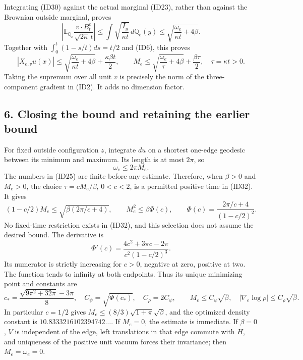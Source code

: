 \documentclass[11pt]{article}
\begin{document}
Integrating (ID30) against the actual marginal (ID23), rather than against the Brownian outside marginal, proves
\[
 \left|\mathbb E_{\mathbb Q_x}\frac{v\cdot B_t^e}{\sqrt{2\kappa}\,t}\right|
 \le\int\sqrt{\frac{I_y}{\kappa t}}\,d\mathbb Q_{\bar e}(y)
 \le\sqrt{\frac{\omega_e}{\kappa t}+4\beta}.
 \tag{ID31}
\]
Together with \(\int_0^t(1-s/t)ds=t/2\) and (ID6), this proves
\[
 |X_{e,v}u(x)|\le\sqrt{\frac{\omega_e}{\kappa t}+4\beta}
                       +\frac{\kappa\beta t}{2},\qquad
 M_e\le\sqrt{\frac{\omega_e}{\tau}+4\beta}+\frac{\beta\tau}{2},
 \quad\tau=\kappa t>0.
 \tag{ID32}
\]
Taking the supremum over all unit \(v\) is precisely the norm of the three-component gradient in (ID2). It adds no dimension factor.

\subsection*{6. Closing the bound and retaining the earlier bound}

For fixed outside configuration \(z\), integrate \(du\) on a shortest one-edge geodesic between its minimum and maximum. Its length is at most \(2\pi\), so
\[
 \omega_e\le2\pi M_e.
 \tag{ID33}
\]
The numbers in (ID25) are finite before any estimate. Therefore, when \(\beta>0\) and \(M_e>0\), the choice \(\tau=cM_e/\beta\), \(0<c<2\), is a permitted positive time in (ID32). It gives
\[
 (1-c/2)M_e\le\sqrt{\beta(2\pi/c+4)},\qquad
 M_e^2\le\beta\Phi(c),\qquad
 \Phi(c)=\frac{2\pi/c+4}{(1-c/2)^2}.
 \tag{ID34}
\]
No fixed-time restriction exists in (ID32), and this selection does not assume the desired bound. The derivative is
\[
 \Phi'(c)=\frac{4c^2+3\pi c-2\pi}{c^2(1-c/2)^3}.
 \tag{ID35}
\]
Its numerator is strictly increasing for \(c>0\), negative at zero, positive at two. The function tends to infinity at both endpoints. Thus its unique minimizing point and constants are
\[
 c_* =\frac{\sqrt{9\pi^2+32\pi}-3\pi}{8},\quad
 C_\psi=\sqrt{\Phi(c_*)},\quad C_\rho=2C_\psi,
 \qquad M_e\le C_\psi\sqrt\beta,\quad
 |\nabla_e\log\rho|\le C_\rho\sqrt\beta.
 \tag{ID36}
\]
In particular \(c=1/2\) gives \(M_e\le(8/3)\sqrt{1+\pi}\sqrt\beta\), and the optimized density constant is \(10.8333216102394742\ldots\). If \(M_e=0\), the estimate is immediate. If \(\beta=0\), \(V\) is independent of the edge, left translations in that edge commute with \(H\), and uniqueness of the positive unit vacuum forces their invariance; then \(M_e=\omega_e=0\).
\end{document}
